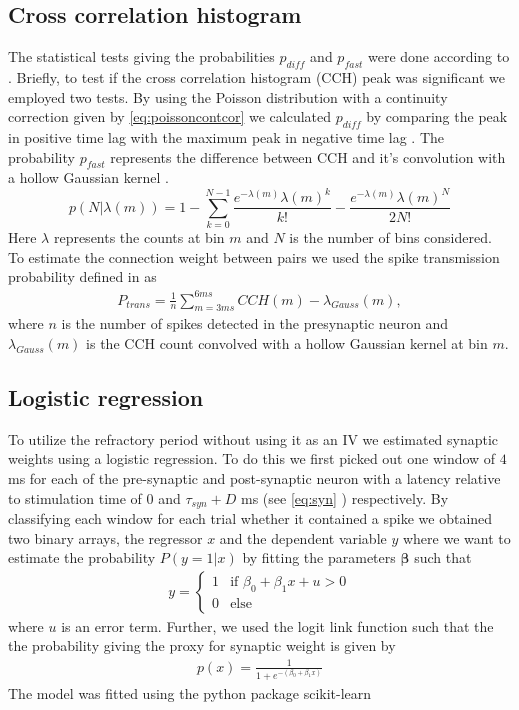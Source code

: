 \documentclass[11pt]{article}
\renewcommand{\vec}[1]{\boldsymbol{#1}}
\begin{document}
\subsection{Cross correlation histogram}\label{sec:method:cch}
The statistical tests giving the probabilities $ p_{diff} $ and $ p_{fast} $ were done according to \cite{Stark2009, English2017}. Briefly, to test if the cross correlation histogram (CCH) peak was significant we employed two tests. By using the Poisson distribution with a continuity correction \citep{Stark2009} given by \cref{eq:poissoncontcor} we calculated $ p_{diff} $ by comparing the peak in positive time lag with the maximum peak in negative time lag \citep{English2017}. The probability $ p_{fast} $ represents the difference between CCH and it's convolution with a hollow Gaussian kernel \citep{Stark2009}.
\begin{equation}
p(N|\lambda(m)) = 1 - \sum_{k=0}^{N-1}\frac{e^{-\lambda(m)}\lambda(m)^k}{k!} - \frac{e^{-\lambda(m)}\lambda(m)^N}{2N!}
\label{eq:poissoncontcor}
\end{equation}
Here $ \lambda $ represents the counts at bin $ m $ and $ N $ is the number of bins considered. To estimate the connection weight between pairs we used the spike transmission probability defined in \cite{English2017} as 
\begin{align}
\label{eq:ptrans}
P_{trans} = \frac{1}{n}\sum_{m=3ms}^{6ms} CCH(m) - \lambda_{Gauss}(m),
\end{align}
where $ n $ is the number of spikes detected in the presynaptic neuron and $\lambda_{Gauss}(m)$ is the CCH count convolved with a hollow Gaussian kernel at bin $m$.

\subsection{Logistic regression}
To utilize the refractory period without using it as an IV we estimated synaptic weights using a logistic regression. To do this we first picked out one window of $ 4 $ ms for each of the pre-synaptic and post-synaptic neuron with a latency relative to stimulation time of $ 0 $ and $ \tau_{syn} + D $ ms (see \cref{eq:syn} ) respectively. By classifying each window for each trial whether it contained a spike we obtained two binary arrays, the regressor $ x $ and the dependent variable $ y $ where we want to estimate the probability $ P(y = 1|x) $ by fitting the parameters $ \vec{\beta} $ such that
\begin{align}
y = \begin{cases}
	1 & \text{if } \beta_0 + \beta_1x + u > 0\\
    0 & \text{else}
\end{cases}
\end{align}
where $ u $ is an error term. Further, we used the logit link function such that the the probability giving the proxy for synaptic weight is given by
\begin{align}
p(x) = \frac{1}{1 + e^{-(\beta_0 + \beta_1x)}}
\end{align}
The model was fitted using the python package scikit-learn \citep{scikit-learn}
\end{document}

